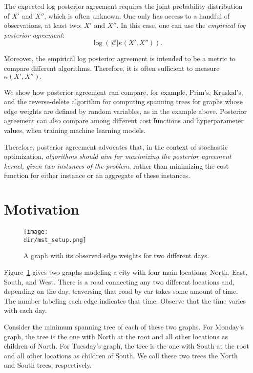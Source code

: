 The expected log posterior agreement requires the joint probability distribution of $X'$ and $X''$, which is often unknown. One only has access to a handful of observations, at least two: $X'$ and $X''$. In this case, one can use the \emph{empirical log posterior agreement}:
%
\begin{equation}
\log \left(\left|\mathcal{C}\right|\kappa\left(X', X''\right)\right).
\label{eq:overview_emp_log_post_agr}
\end{equation}

Moreover, the empirical log posterior agreement is intended to be a metric to compare different algorithms. Therefore, it is often sufficient to measure $\kappa\left(X', X''\right).$

We show how posterior agreement can compare, for example, Prim's, Kruskal's, and the reverse-delete algorithm for computing spanning trees for graphs whose edge weights are defined by random variables, as in the example above. Posterior agreement can also compare among different cost functions and hyperparameter values, when training machine learning models.

Therefore, posterior agreement advocates that, in the context of stochastic optimization, \emph{algorithms should aim for maximizing the posterior agreement kernel, given two instances of the problem}, rather than minimizing the cost function for either instance or an aggregate of these instances.


\section{Motivation}

\begin{figure}
\texttt{[image: \\dir/mst\_setup.png]}
\caption{A graph with its observed edge weights for two different days.}
\label{fig:mst_setup}
\end{figure}

Figure~\ref{fig:mst_setup} gives two graphs modeling a city with four main locations: North, East, South, and West. There is a road connecting any two different locations and, depending on the day, traversing that road by car takes some amount of time. The number labeling each edge indicates that time. Observe that the time varies with each day.

Consider the minimum spanning tree of each of these two graphs. For Monday's graph, the tree is the one with North at the root and all other locations as children of North. For Tuesday's graph, the tree is the one with South at the root and all other locations as children of South. We call these two trees the North and South trees, respectively.

